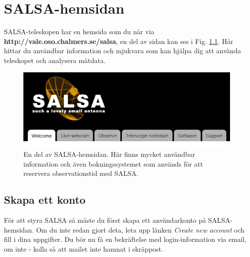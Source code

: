 \chapter{SALSA-hemsidan}
SALSA-teleskopen har en hemsida som du når via {\bf
http://vale.oso.chalmers.se/salsa}, en del av sidan kan ses i Fig.
\ref{fig:website}. Här hittar du användbar information och mjukvara som kan
hjälpa dig att använda teleskopet och analysera mätdata. 
\begin{figure}[h]
\centering
\includegraphics[width=\textwidth]{../figures/SALSA_website.png}
\caption{\label{fig:website} En del av SALSA-hemsidan. Här finns mycket
användbar information och även bokningssystemet som används för att reservera
observationstid med SALSA.}
\end{figure}

\section{Skapa ett konto}
För att styra SALSA så måste du först skapa ett användarkonto på SALSA-hemsidan. 
Om du inte redan gjort deta, leta upp länken \emph{Create new account} 
och fill i dina uppgifter. Du bör nu få en bekräftelse med login-information 
via email, om inte - kolla så att mailet inte hamnat i skräppost. 

